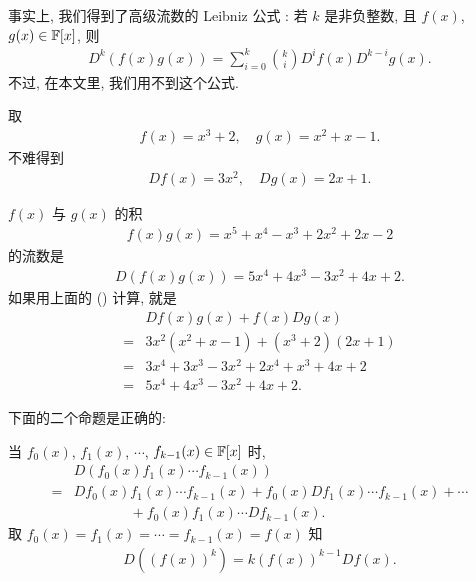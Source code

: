 \begin{remark}
    事实上, 我们得到了高级流数的 Leibniz 公式 : 若 $k$ 是非负整数, 且 $f(x)$, $g(x) \in \mathbb{F}[x]$, 则
    \begin{align*}
        D^k (f(x)g(x)) = \sum_{i = 0}^{k} \binom{k}{i} D^i f(x) D^{k-i} g(x).
    \end{align*}
    不过, 在本文里, 我们用不到这个公式.
\end{remark}

\begin{example}
    取
    \begin{align*}
        f(x) = x^3 + 2, \quad g(x) = x^2 + x - 1.
    \end{align*}
    不难得到
    \begin{align*}
        Df (x) = 3x^2, \quad Dg (x) = 2x + 1.
    \end{align*}

    $f(x)$ 与 $g(x)$ 的积
    \begin{align*}
        f(x) g(x) = x^5 + x^4 - x^3 + 2x^2 + 2x - 2
    \end{align*}
    的流数是
    \begin{align*}
        D(f(x) g(x)) = 5x^4 + 4x^3 - 3x^2 + 4x + 2.
    \end{align*}
    如果用上面的 () 计算, 就是
    \begin{align*}
             & Df (x) g(x) + f(x) Dg (x)                \\
        = {} & 3x^2 (x^2 + x - 1) + (x^3 + 2) (2x + 1)  \\
        = {} & 3x^4 + 3x^3 - 3x^2 + 2x^4 + x^3 + 4x + 2 \\
        = {} & 5x^4 + 4x^3 - 3x^2 + 4x + 2.
    \end{align*}
\end{example}

下面的二个命题是正确的:

\begin{proposition}
    当 $f_0 (x)$, $f_1 (x)$, $\cdots$, $f_{k-1} (x) \in \mathbb{F}[x]$ 时,
    \begin{align*}
             & D(f_0 (x) f_1 (x) \cdots f_{k-1} (x))                                              \\
        = {} & Df_0 (x) f_1 (x) \cdots f_{k-1} (x) + f_0 (x) Df_1 (x) \cdots f_{k-1} (x) + \cdots \\
             & \qquad \qquad + f_0 (x) f_1 (x) \cdots Df_{k-1} (x).
    \end{align*}
    取 $f_0 (x) = f_1 (x) = \cdots = f_{k-1} (x) = f(x)$ 知
    \begin{align*}
        D((f(x))^k) = k(f(x))^{k-1} Df(x).
    \end{align*}
\end{proposition}

